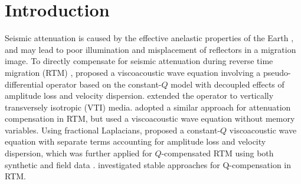 \section{Introduction}
Seismic attenuation is caused by the effective anelastic properties of the Earth \cite[]{aki,carc07}, and may lead to poor illumination and misplacement of reflectors in a migration image. To directly compensate for seismic attenuation during reverse time migration (RTM) \cite[]{baysal83,McMechan83,whitmore83}, \cite{zhang10} proposed a viscoacoustic wave equation involving a pseudo-differential operator based on the constant-$Q$ model \cite[]{kja79} with decoupled effects of amplitude loss and velocity dispersion. \cite{suh12} extended the operator to vertically transversely isotropic (VTI) media. \cite{bai13} adopted a similar approach for attenuation compensation in RTM, but used a viscoacoustic wave equation without memory variables. Using fractional Laplacians, \cite{zhu14a} proposed a constant-$Q$ viscoacoustic wave equation with separate terms accounting for amplitude loss and velocity dispersion, which was further applied for $Q$-compensated RTM using both synthetic and field data \cite[]{zhu14b,zhu15fld}. \cite{fletcher12,me15c} investigated stable approaches for Q-compensation in RTM. 

